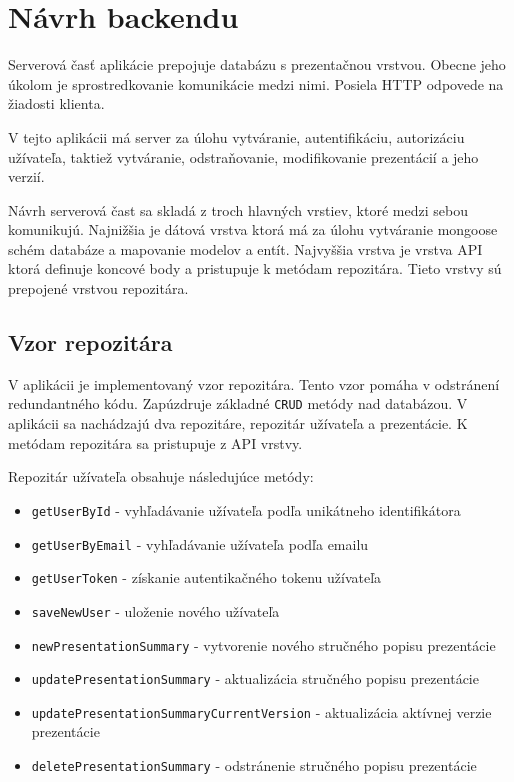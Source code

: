 \section{Návrh backendu}
Serverová časť aplikácie prepojuje databázu s prezentačnou vrstvou. Obecne jeho úkolom je sprostredkovanie komunikácie medzi nimi. Posiela HTTP odpovede na žiadosti klienta.

V tejto aplikácii má server za úlohu vytváranie, autentifikáciu, autorizáciu užívateľa, taktiež vytváranie, odstraňovanie, modifikovanie prezentácií a jeho verzií.

Návrh serverová čast sa skladá z troch hlavných vrstiev, ktoré medzi sebou komunikujú. Najnižšia je dátová vrstva ktorá má za úlohu vytváranie mongoose schém databáze a mapovanie modelov a entít. Najvyššia vrstva je vrstva API ktorá definuje koncové body a pristupuje k metódam repozitára. Tieto vrstvy sú prepojené vrstvou repozitára.

\subsection*{Vzor repozitára}
V aplikácii je implementovaný vzor repozitára. Tento vzor pomáha v odstránení redundantného kódu. Zapúzdruje základné \texttt{CRUD} metódy nad databázou. V aplikácii sa nachádzajú dva repozitáre, repozitár užívateľa a prezentácie. K metódam repozitára sa pristupuje z API vrstvy. 

\vspace{5mm}
\vspace{5mm}

Repozitár užívateľa obsahuje následujúce metódy:
    \begin{itemize}
        \item\texttt{getUserById} - vyhľadávanie užívateľa podľa unikátneho identifikátora
        \item\texttt{getUserByEmail} - vyhľadávanie užívateľa podľa emailu
        \item\texttt{getUserToken} - získanie autentikačného tokenu užívateľa
        \item\texttt{saveNewUser} - uloženie nového užívateľa
        \item\texttt{newPresentationSummary} - vytvorenie nového stručného popisu prezentácie
        \item\texttt{updatePresentationSummary} - aktualizácia stručného popisu prezentácie
        \item\texttt{updatePresentationSummaryCurrentVersion} - aktualizácia aktívnej verzie prezentácie
        \item\texttt{deletePresentationSummary} - odstránenie stručného popisu prezentácie
    \end{itemize}
    
